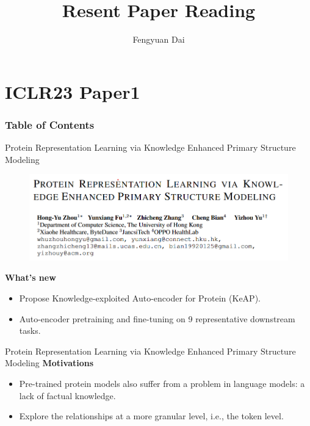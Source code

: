\documentclass[notheorems, aspectratio=54]{beamer}
\title[Recent Paper Reading]{Resent Paper Reading}
\author{Fengyuan Dai}
\institute[Westlake University]{daifengyuan@westlake.edu.cn}
\begin{document}
\begin{frame}
    \titlepage
\end{frame}



\section{ICLR23 Paper1}
\begin{frame}
    \frametitle{Table of Contents}
    \tableofcontents[currentsection]
\end{frame}

\begin{frame}{Protein Representation Learning via Knowledge Enhanced Primary Structure Modeling}
  \begin{figure}[!h]
    \centering
    \includegraphics[width=0.9\linewidth]{figures/PRL-title.png}
  \end{figure}
  \textbf{What's new}
  \begin{itemize}
    \item Propose Knowledge-exploited Auto-encoder for Protein (KeAP). 
    \item Auto-encoder pretraining and fine-tuning on 9 representative downstream tasks.  
  \end{itemize}
\end{frame}


\begin{frame}{Protein Representation Learning via Knowledge Enhanced Primary Structure Modeling}
  \textbf{Motivations}
  \begin{itemize}
      \item Pre-trained protein models also suffer from a problem in language models: a lack of factual knowledge.
      \item Explore the relationships at a more granular level, i.e., the token level.
  \end{itemize}


\end{frame}
\end{document}
